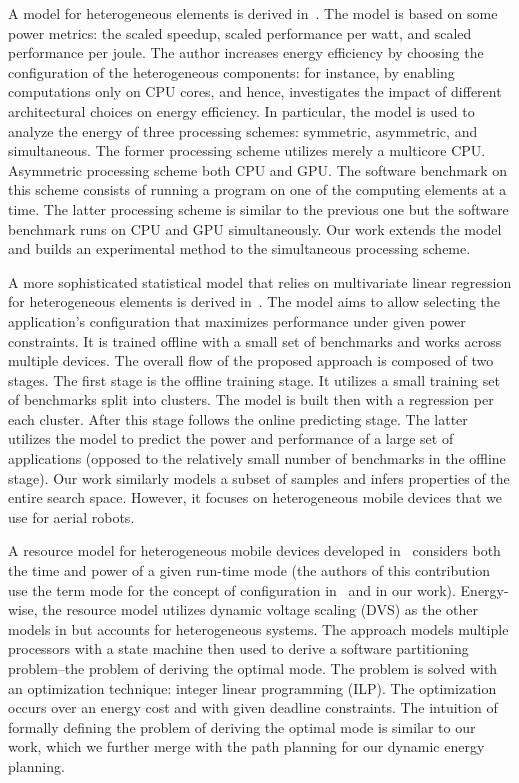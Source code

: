 A model for heterogeneous elements is derived in~\citep{marowka2017energy}. The model is based on some power metrics: the scaled speedup, scaled performance per watt, and scaled performance per joule. The author increases energy efficiency by choosing the configuration of the heterogeneous components: for instance, by enabling computations only on CPU cores, and hence, investigates the impact of different architectural choices on energy efficiency. In particular, the model is used to analyze the energy of three processing schemes: symmetric, asymmetric, and simultaneous. The former processing scheme utilizes merely a multicore CPU. Asymmetric processing scheme both CPU and GPU. The software benchmark on this scheme consists of running a program on one of the computing elements at a time. The latter processing scheme is similar to the previous one but the software benchmark runs on CPU and GPU simultaneously. Our work extends the model and builds an experimental method to the simultaneous processing scheme.

A more sophisticated statistical model that relies on multivariate linear regression for heterogeneous elements is derived in~\citep{bailey2014adaptive}. The model aims to allow selecting the application's configuration that maximizes performance under given power constraints. It is trained offline with a small set of benchmarks and works across multiple devices. The overall flow of the proposed approach is composed of two stages. The first stage is the offline training stage. It utilizes a small training set of benchmarks split into clusters. The model is built then with a regression per each cluster. After this stage follows the online predicting stage. The latter utilizes the model to predict the power and performance of a large set of applications (opposed to the relatively small number of benchmarks in the offline stage). Our work similarly models a subset of samples and infers properties of the entire search space. However, it focuses on heterogeneous mobile devices that we use for aerial robots.

A resource model for heterogeneous mobile devices developed in~\citep{goraczko2008energy} considers both the time and power of a given run-time mode (the authors of this contribution use the term mode for the concept of configuration in~\citep{marowka2017energy,bailey2014adaptive} and in our work). Energy-wise, the resource model utilizes dynamic voltage scaling (DVS) as the other models in  but accounts for heterogeneous systems. The approach models multiple processors with a state machine then used to derive a software partitioning problem--the problem of deriving the optimal mode. The problem is solved with an optimization technique: integer linear programming (ILP). The optimization occurs over an energy cost and with given deadline constraints. The intuition of formally defining the problem of deriving the optimal mode is similar to our work, which we further merge with the path planning for our dynamic energy planning. 

